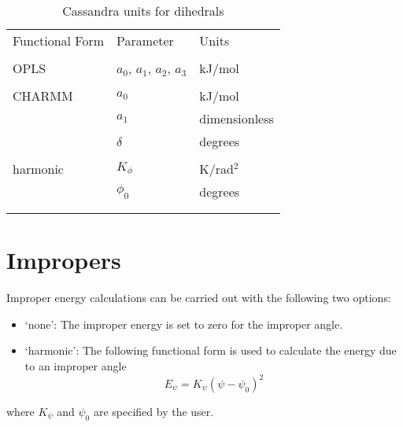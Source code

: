 \begin{center}
\begin{table}[h]
	\begin{center}
	\caption{Cassandra units for dihedrals}
	\begin{tabular} {l l l} \\ \hline \hline
	Functional Form & Parameter & Units \\ \\
	OPLS & $a_0$, $a_1$,  $a_2$, $a_3$ & kJ/mol \\ \\
	CHARMM & $a_0$ & kJ/mol \\
	                 & $a_1$ & dimensionless \\
	                 & $\delta$ & degrees \\ \\
	 harmonic & $K_\phi$ & K/rad$^2$ \\
	                 & $\phi_0$ & degrees \\  \\\hline \\
	\end{tabular}
	\end{center}
	\label{Tab:Dihedral_Units}
\end{table}
\end{center}

\section{Impropers}\label{Sec:Imp}

Improper energy calculations can be carried out with the following two options:

\begin{itemize}

\item `none': The improper energy is set to zero for the improper angle.

\item `harmonic': The following functional form is used to calculate
  the energy due to an improper angle
%
\begin{equation}
E_\psi = K_\psi \left ( \psi - \psi_0 \right )^2
\end{equation}
\end{itemize}
where $K_\psi$ and $\psi_0$ are specified by the user.

